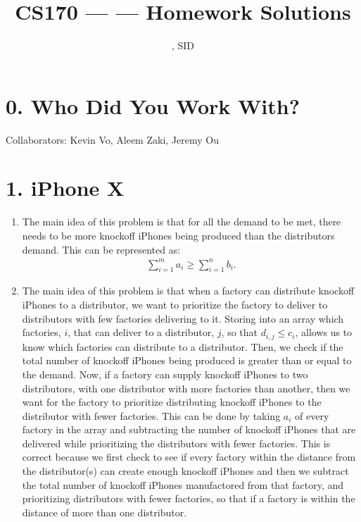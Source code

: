 \documentclass[11pt]{article}
\title{CS170 --- \Session --- Homework \Homework \space Solutions}
\author{\Name, SID \SID}
\date{}
\begin{document}
\maketitle

\section*{0. Who Did You Work With?}

Collaborators: Kevin Vo, Aleem Zaki, Jeremy Ou



\newpage
\section*{1. iPhone X}
\begin{enumerate}[label=(\alph*)]
\item
The main idea of this problem is that for all the demand to be met, there needs to be more knockoff iPhones being produced than the distributors demand. This can be represented as:
\begin{align*}
\sum_{i = 1}^{m} {a_i} \geq \sum_{i = 1}^{n} {b_i}.
\end{align*}



\item
The main idea of this problem is that when a factory can distribute knockoff iPhones to a distributor, we want to prioritize the factory to deliver to distributors with few factories delivering to it. Storing into an array which factories, $i$, that can deliver to a distributor, $j$, so that $d_{i, j} \leq c_i$, allows us to know which factories can distribute to a distributor. Then, we check if the total number of knockoff iPhones being produced is greater than or equal to the demand. Now, if a factory can supply knockoff iPhones to two distributors, with one distributor with more factories than another, then we want for the factory to prioritize distributing knockoff iPhones to the distributor with fewer factories. This can be done by taking $a_i$ of every factory in the array and subtracting the number of knockoff iPhones that are delivered while prioritizing the distributors with fewer factories. This is correct because we first check to see if every factory within the distance from the distributor(s) can create enough knockoff iPhones and then we subtract the total number of knockoff iPhones manufactored from that factory, and prioritizing distributors with fewer factories, so that if a factory is within the distance of more than one distributor.




\end{enumerate}
\end{document}
